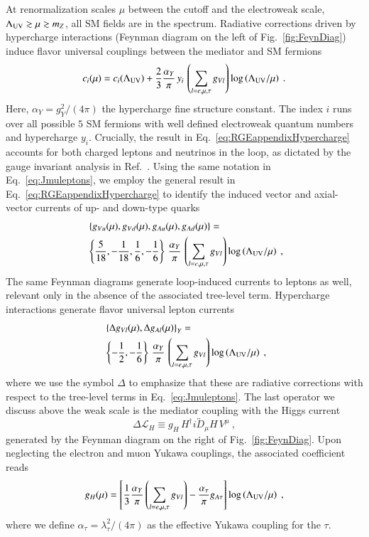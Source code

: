 \documentclass[final,5p,twocolumn]{elsarticle}
\newcommand{\be}{\begin{equation}}
\newcommand{\ee}{\end{equation}}
\newcommand{\Eq}[1]{Eq.~\eqref{#1}}
\newcommand{\Fig}[1]{Fig.~\ref{#1}}
\newcommand{\Ref}[1]{Ref.~\cite{#1}}
\newcommand{\LambdaUV}{\Lambda_{\rm UV}}
\begin{document}
At renormalization scales $\mu$ between the cutoff and the electroweak scale, $\Lambda_{\rm UV} \gtrsim \mu \gtrsim m_Z$, all SM fields are in the spectrum. Radiative corrections driven by hypercharge interactions (Feynman diagram on the left of \Fig{fig:FeynDiag}) induce flavor universal couplings between the mediator and SM fermions
\be
c_i(\mu) = c_i(\LambdaUV) + \frac{2}{3} \frac{\alpha_Y}{\pi} \, y_i \, \left( \sum_{l = e, \mu, \tau} g_{V l}  \right)
\log\left(\Lambda_{\rm UV} / \mu\right) \ .
\label{eq:RGEappendixHypercharge}
\ee
Here, $\alpha_Y = g_Y^2 / (4 \pi)$ the hypercharge fine structure constant. The index $i$ runs over all possible $5$ SM fermions with well defined electroweak quantum numbers and hypercharge $y_i$. Crucially, the result in \Eq{eq:RGEappendixHypercharge} accounts for both charged leptons and neutrinos in the loop, as dictated by the gauge invariant analysis in \Ref{D'Eramo:2014aba}. Using the same notation in Eq.~\eqref{eq:Jmuleptons}, we employ the general result in \Eq{eq:RGEappendixHypercharge} to identify the induced vector and axial-vector currents of up- and down-type quarks
\begin{align}
& \, \left\{g_{V u}(\mu), g_{V d}(\mu), g_{A u}(\mu), g_{A d}(\mu) \right\} =  \\ & \, \nonumber
\left\{ \frac{5}{18}, - \frac{1}{18}, \frac{1}{6} , - \frac{1}{6} \right\} \, \frac{\alpha_Y}{\pi} \, \left( \sum_{l = e, \mu, \tau} g_{V l}  \right)
\log\left(\Lambda_{\rm UV} / \mu\right)  \ ,
\label{eq:onelooptoquarks}
\end{align}
The same Feynman diagrams generate loop-induced currents to leptons as well, relevant only in the absence of the associated tree-level term. Hypercharge interactions generate flavor universal lepton currents
\begin{align}
& \, \left\{\Delta g_{V l}(\mu), \Delta g_{A l}(\mu) \right\}_Y = \\ & \, \nonumber
\left\{- \frac{1}{2}, -  \frac{1}{6} \right\} \, \frac{\alpha_Y}{\pi} \, \left( \sum_{l = e, \mu, \tau} g_{V l}  \right)
\log\left(\Lambda_{\rm UV} / \mu\right)  \ ,
\end{align}
where we use the symbol $\Delta$ to emphasize that these are radiative corrections with respect to the tree-level terms in Eq.~\eqref{eq:Jmuleptons}. The last operator we discuss above the weak scale is the mediator coupling with the Higgs current 
\be
\Delta \mathcal{L}_H \equiv g_H \, H^\dagger i \overleftrightarrow D_\mu H \, V^\mu \ ,
\ee
generated by the Feynman diagram on the right of \Fig{fig:FeynDiag}. Upon neglecting the electron and muon Yukawa couplings, the associated coefficient reads
\be
g_H(\mu) = \left[  \frac{1}{3}  \frac{\alpha_Y}{\pi}  \left(\sum_{l = e, \mu, \tau} g_{V l} \right)
- \frac{\alpha_\tau}{\pi} g_{A \tau} \right] \log\left(\Lambda_{\rm UV} / \mu\right) \ ,
\label{eq:gHapprox}
\ee
where we define $\alpha_\tau = \lambda_\tau^2 / (4 \pi)$ as the effective Yukawa coupling for the $\tau$.
\end{document}
